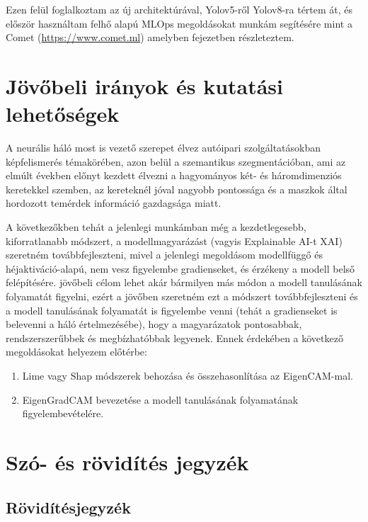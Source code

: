\documentclass[12pt,oneside,a4paper]{article}
\newcommand{\newsection}[1]{\clearpage\section{#1}}\label{makro}
\theoremstyle{remark}
\begin{document}
    Ezen felül foglalkoztam az új architektúrával, Yolov5-ről Yolov8-ra tértem át, és először használtam felhő alapú
    MLOps megoldásokat munkám segítésére mint a Comet (\url{https://www.comet.ml}) amelyben  fejezetben
    részleteztem.

\newsection{Jövőbeli irányok és kutatási lehetőségek}\label{sec:jovobeli-iranyok-es-kutatasi-lehetosegek}
    A  neurális háló most is vezető szerepet élvez autóipari szolgáltatásokban képfelismerés
    témakörében, azon belül a szemantikus szegmentációban, ami az elmúlt években előnyt kezdett élvezni a hagyományos
    két- és háromdimenziós keretekkel szemben, az kereteknél jóval nagyobb pontossága és a maszkok által hordozott
    temérdek információ gazdagsága miatt.

    A következőkben tehát a jelenlegi munkámban még a kezdetlegesebb, kiforratlanabb módszert, a modellmagyarázást (vagyis Explainable AI-t
    \ac{XAI}) szeretném továbbfejleszteni, mivel a jelenlegi megoldásom modellfüggő és héjaktiváció-alapú, nem vesz figyelembe gradienseket, és érzékeny a modell belső felépítésére.
    jövőbeli célom lehet akár bármilyen más módon a modell tanulásának folyamatát figyelni, ezért a jövőben szeretném ezt a módszert továbbfejleszteni
    és a modell tanulásának folyamatát is figyelembe venni (tehát a gradienseket is belevenni a háló értelmezésébe), hogy a magyarázatok pontosabbak, rendszerszerűbbek és megbízhatóbbak legyenek.
    Ennek érdekében a következő megoldásokat helyezem előtérbe:
    \begin{enumerate}
        \item Lime vagy Shap módszerek behozása és összehasonlítása az EigenCAM-mal. \cite{ribeiro-etal-2016-trust,lundberg2017unified}
        \item EigenGradCAM bevezetése a modell tanulásának folyamatának figyelembevételére.
    \end{enumerate}


\printindex\label{ossz:indexjegyzek}

\newsection{Szó- és rövidítés jegyzék}\label{sec:szó-es-rövidités-jegyzék}
\printglossary\label{ossz:glossary}
\newpage
\subsection{Rövidítésjegyzék}\label{subsec:röviditésjegyzék}
\begin{acronym}\label{ossz:roviditesjegyzek}
\end{acronym}
\newpage

\label{ossz:irodalomjegyzek}
\end{document}
